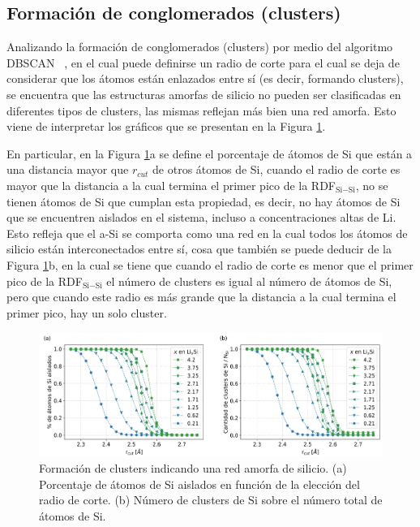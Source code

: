 \subsection{Formación de conglomerados (clusters)}\label{s:clusters}

Analizando la formación de conglomerados (clusters) por medio del algoritmo DBSCAN 
~\cite{ester1996}, en el cual puede definirse un radio de corte para el cual se 
deja de considerar que los átomos están enlazados entre sí (es decir, formando 
clusters), se encuentra que las estructuras amorfas de silicio no pueden ser 
clasificadas en diferentes tipos de clusters, las mismas reflejan más bien 
una red amorfa. Esto viene de interpretar los gráficos que se presentan en la 
Figura \ref{fig:clusters}. 

En particular, en la Figura \ref{fig:clusters}a se define el porcentaje 
de átomos de Si que están a una distancia mayor que $r_{cut}$ de otros átomos de 
Si, cuando el radio de corte es mayor que la distancia a la cual termina el 
primer pico de la RDF$_{\text{Si}-\text{Si}}$, no se tienen átomos de Si que cumplan esta 
propiedad, es decir, no hay átomos de Si que se encuentren aislados en el sistema,
incluso a concentraciones altas de Li. Esto refleja que el a-Si se comporta como 
una red en la cual todos los átomos de silicio están interconectados entre sí, 
cosa que también se puede deducir de la Figura \ref{fig:clusters}b, en la cual 
se tiene que cuando el radio de corte es menor que el primer pico de la RDF$_{\text{Si}-\text{Si}}$ 
el número de clusters es igual al número de átomos de Si, pero que cuando este 
radio es más grande que la distancia a la cual termina el primer pico, hay un 
solo cluster.

\begin{figure}[h]
    \centering
    \includegraphics[width=\textwidth]{Silicio/caracterizacion/resultados/clusters/clusters.png}
    \caption{Formación de clusters indicando una red amorfa de silicio. (a) 
    Porcentaje de átomos de Si aislados en función de la elección del
    radio de corte. (b) Número de clusters de Si sobre el número total de átomos 
    de Si.}
    \label{fig:clusters}
\end{figure}
